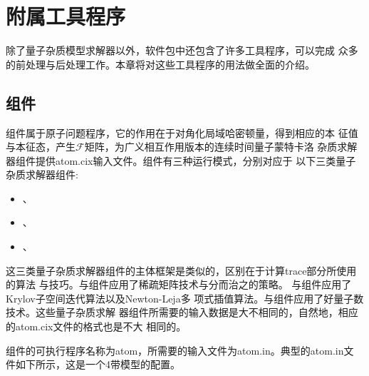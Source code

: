 \chapter{{\iqist}附属工具程序}
\label{chap:tools}

除了量子杂质模型求解器以外，{\iqist}软件包中还包含了许多工具程序，可以完成
众多的前处理与后处理工作。本章将对这些工具程序的用法做全面的介绍。

\section{{\jasmine}组件}
\label{sec:jasmine}

{\jasmine}组件属于原子问题程序，它的作用在于对角化局域哈密顿量，得到相应的本
征值与本征态，产生$\mathcal{F}$矩阵，为广义相互作用版本的连续时间量子蒙特卡洛
杂质求解器组件提供atom.cix输入文件。{\jasmine}组件有三种运行模式，分别对应于
以下三类量子杂质求解器组件:

\begin{itemize}
\item {\begonia}、{\lavender}
\item {\camellia}、{\epiphyllum}
\item {\pansy}、{\manjushaka}
\end{itemize}

这三类量子杂质求解器组件的主体框架是类似的，区别在于计算trace部分所使用的算法
与技巧。{\begonia}与{\lavender}组件应用了稀疏矩阵技术与分而治之的策略。
{\camellia}与{\epiphyllum}组件应用了Krylov子空间迭代算法以及Newton-Leja多
项式插值算法。{\pansy}与{\manjushaka}组件应用了好量子数技术。这些量子杂质求解
器组件所需要的输入数据是大不相同的，自然地，相应的atom.cix文件的格式也是不大
相同的。

{\jasmine}组件的可执行程序名称为atom，所需要的输入文件为atom.in。典型的atom.in文
件如下所示，这是一个4带模型的配置。

